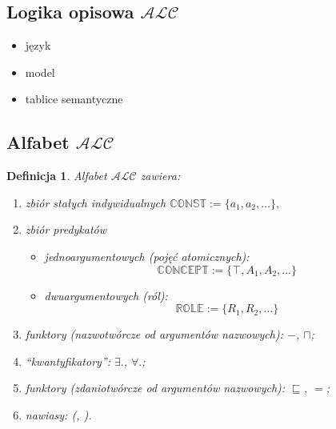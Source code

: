 \documentclass[12pt]{article}
\newtheorem{definicja}{Definicja}
\begin{document}
\subsection{Logika opisowa $\mathcal{ALC}$}
%
\begin{itemize}
\item język
\item model
\item tablice semantyczne
\end{itemize}
%


\subsection{Alfabet $\mathcal{ALC}$}
%
\begin{definicja}
\label{alfabet (ALC)}
Alfabet $\mathcal{ALC}$ zawiera:%
\begin{enumerate}
\item zbiór stałych indywidualnych $\mathbb{CONST} := \{a_{1}, a_{2}, \dots\},$
%
\item zbiór predykatów %
\begin{itemize}
\item jednoargumentowych (\emph{pojęć atomicznych}):
$$\mathbb{CONCEPT} := \{\top, A_{1}, A_{2}, \dots\}$$%
\item dwuargumentowych (\emph{ról}):
$$\mathbb{ROLE} := \{R_{1}, R_{2}, \dots\}$$
\end{itemize}
%
\item funktory (nazwotwórcze od argumentów nazwowych): $-$, $\sqcap$;
%
\item ``kwantyfikatory'': $\exists .$, $\forall .$;
%
\item funktory (zdaniotwórcze od argumentów nazwowych): $\sqsubseteq$, $=$;
%
\item nawiasy: (, ).
\end{enumerate}
\end{definicja}
%
\end{document}
